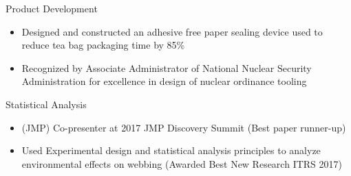 \documentclass[]{friggeri-cv}
\begin{document}
\begin{entrylist}







    \entry
    {}
    {Product Development}
    {}
    {\vspace{-4mm}
    \begin{itemize}
        \item Designed and constructed an adhesive free paper sealing device used to reduce tea bag packaging time by 85\%
        \item Recognized by Associate Administrator of National Nuclear Security Administration for excellence in design of nuclear ordinance tooling

    \end{itemize}
    \vspace{1mm}}

    \entry
    {}
    {Statistical Analysis}
    {}
    {\vspace{-4mm}
    \begin{itemize}
    \item (JMP) Co-presenter at 2017 JMP Discovery Summit (Best paper runner-up)
    \item Used Experimental design and statistical analysis principles to analyze environmental effects on webbing (Awarded Best New Research ITRS 2017)


\end{itemize}}
\end{entrylist}
\end{document}
